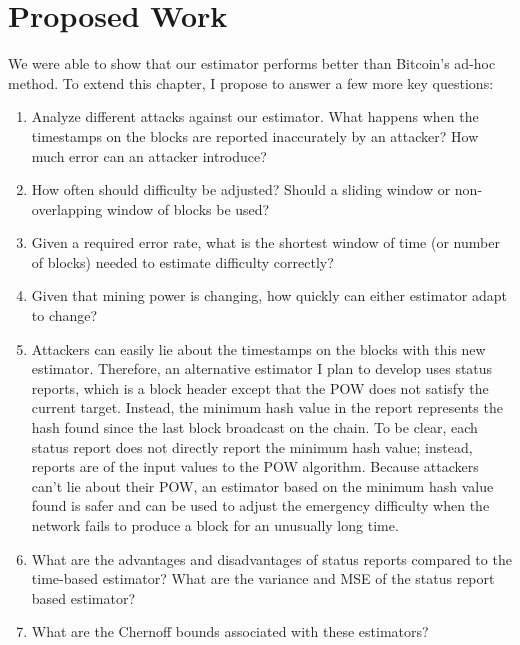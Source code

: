 \section{Proposed Work}
We were able to show that our estimator performs better than Bitcoin's ad-hoc method. To extend this chapter, I propose to answer a few more key questions:
\begin{enumerate}
\item Analyze different attacks against our estimator. What happens when the timestamps on the blocks are reported inaccurately by an attacker? How much error can an attacker introduce?
\item How often should difficulty be adjusted? Should a sliding window or non-overlapping window of blocks be used?
\item Given a required error rate, what is the shortest window of time (or number of blocks) needed to estimate difficulty correctly?
\item Given that mining power is changing, how quickly can either estimator adapt to change?
\item Attackers can easily lie about the timestamps on the blocks with this new estimator. Therefore, an alternative estimator I plan to develop uses status reports, which is a block header except that the POW does not satisfy the current target. Instead, the minimum hash value in the report represents the hash found since the last block broadcast on
the chain. To be clear, each status report does not directly report the minimum hash value; instead, reports are of the input values to the POW algorithm. Because attackers can't lie about their POW, an estimator based on the minimum hash value found is safer and can be used to adjust the emergency difficulty when the network fails to produce a block for an unusually long time.
\item What are the advantages and disadvantages of status reports compared to the time-based estimator? What are the variance and MSE of the status report based estimator?
\item What are the Chernoff bounds associated with these estimators?
\end{enumerate}


%

